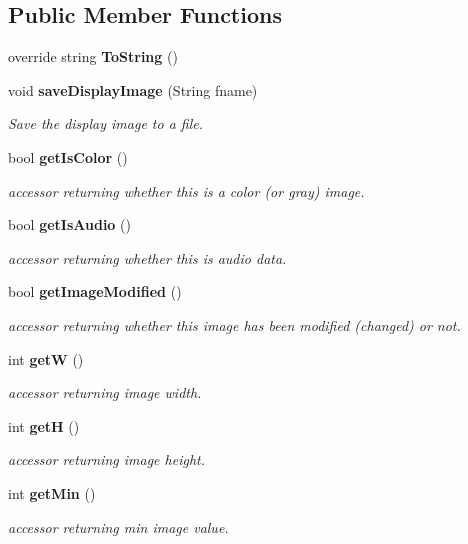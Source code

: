 \subsection*{Public Member Functions}
\begin{CompactItemize}
\item 
override string {\bf To\-String} ()
\item 
void {\bf save\-Display\-Image} (String fname)
\begin{CompactList}\small\item\em Save the display image to a file. \item\end{CompactList}\item 
bool {\bf get\-Is\-Color} ()
\begin{CompactList}\small\item\em accessor returning whether this is a color (or gray) image. \item\end{CompactList}\item 
bool {\bf get\-Is\-Audio} ()
\begin{CompactList}\small\item\em accessor returning whether this is audio data. \item\end{CompactList}\item 
bool {\bf get\-Image\-Modified} ()
\begin{CompactList}\small\item\em accessor returning whether this image has been modified (changed) or not. \item\end{CompactList}\item 
int {\bf get\-W} ()
\begin{CompactList}\small\item\em accessor returning image width. \item\end{CompactList}\item 
int {\bf get\-H} ()
\begin{CompactList}\small\item\em accessor returning image height. \item\end{CompactList}\item 
int {\bf get\-Min} ()
\begin{CompactList}\small\item\em accessor returning min image value. \item\end{CompactList}\item 

\end{CompactItemize}
